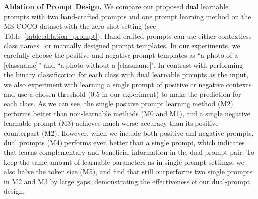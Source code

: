  \textbf{Ablation of Prompt Design.}  We compare our proposed dual learnable prompts with two hand-crafted prompts and one prompt learning method on the MS-COCO dataset with the zero-shot setting (see Table~\ref{table:ablation_prompt}). Hand-crafted prompts can use either contextless class names~\cite{li2017learning} or manually designed prompt templates. In our experiments, we carefully choose the positive and negative prompt templates as ``a photo of a [classname]'' and ``a photo without a [classname]''. In contrast with performing the binary classification for each class with dual learnable prompts as the input, we also experiment with learning a single prompt of positive or negative contexts and use a chosen threshold (0.5 in our experiment) to make the prediction for each class. 
As we can see, the single positive prompt learning method (M2) performs better than non-learnable methods (M0 and M1), and a single negative learnable prompt (M3) achieves much worse accuracy than its positive counterpart (M2).  
However, when we include both positive and negative prompts, dual prompts (M4) performs even better than a single prompt, which indicates that \ours learns complementary and beneficial information in the dual prompt pair. 
To keep the same amount of learnable parameters as in single prompt settings, we also halve the token size (M5), and find that \ours still outperforms two single prompts in M2 and M3 by large gaps, demonstrating the effectiveness of our dual-prompt design.





